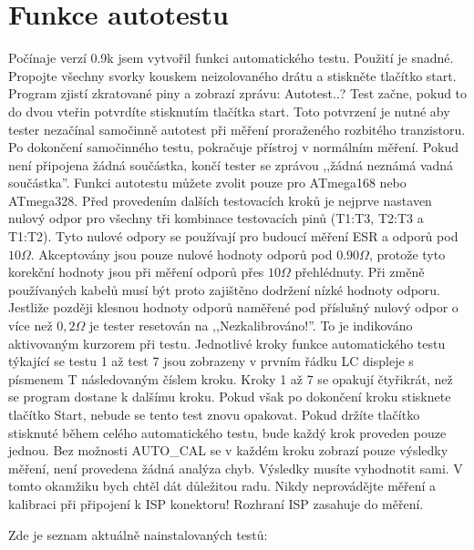 
\section{Funkce autotestu}
\label{sec:selftest}
Počínaje verzí 0.9k jsem vytvořil funkci automatického testu.
Použití je snadné.
Propojte všechny svorky kouskem neizolovaného drátu a stiskněte tlačítko start.
Program zjistí zkratované piny a zobrazí zprávu: Autotest..?
Test začne, pokud to do dvou vteřin potvrdíte stisknutím tlačítka start.
Toto potvrzení je nutné aby tester nezačínal samočinně autotest při měření proraženého rozbitého tranzistoru.
Po dokončení samočinného testu, pokračuje přístroj v normálním měření.
Pokud není připojena žádná součástka, končí tester se zprávou ,,žádná neznámá vadná součástka''.
Funkci autotestu můžete zvolit pouze pro ATmega168 nebo ATmega328.
Před provedením dalších testovacích kroků je nejprve nastaven nulový odpor pro všechny tři kombinace testovacích pinů
(T1:T3, T2:T3 a T1:T2). Tyto nulové odpory se používají pro budoucí měření ESR a odporů pod \(10\Omega\).
Akceptovány jsou pouze nulové hodnoty odporů pod \(0.90\Omega\), protože tyto korekční hodnoty jsou při měření odporů přes \(10\Omega\) přehlédnuty.
Při změně používaných kabelů musí být proto zajištěno dodržení nízké hodnoty odporu.
Jestliže později klesnou hodnoty odporů naměřené pod příslušný nulový odpor o více
než \(0,2\Omega\) je tester resetován na ,,Nezkalibrováno!''.
To je indikováno aktivovaným kurzorem při testu.
Jednotlivé kroky funkce automatického testu týkající se testu 1 až test 7 jsou zobrazeny v prvním řádku LC displeje s písmenem T následovaným číslem kroku.
Kroky 1 až 7 se opakují čtyřikrát, než se program dostane k dalšímu kroku.
Pokud však po dokončení kroku stisknete tlačítko Start, nebude se tento test znovu opakovat.
Pokud držíte tlačítko stisknuté během celého automatického testu, bude každý krok proveden pouze jednou.
Bez možnosti AUTO\_CAL se v každém kroku zobrazí pouze výsledky měření, není provedena žádná analýza chyb.
Výsledky musíte vyhodnotit sami.
V tomto okamžiku bych chtěl dát důležitou radu.
Nikdy neprovádějte měření a kalibraci při připojení k ISP konektoru! Rozhraní ISP zasahuje do měření.

\vspace{1cm}
Zde je seznam aktuálně nainstalovaných testů:
\vspace{1cm}

